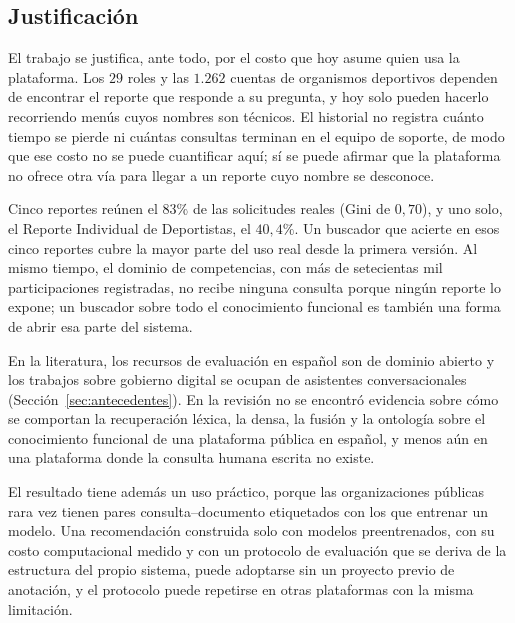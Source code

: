 \documentclass[11pt,letterpaper]{article}
\numberwithin{equation}{section}
\begin{document}
\subsection{Justificación}
\label{sec:justificacion}
El trabajo se justifica, ante todo, por el costo que hoy asume quien usa la plataforma. Los $29$ roles y las $1.262$ cuentas de organismos deportivos dependen de encontrar el reporte que responde a su pregunta, y hoy solo pueden hacerlo recorriendo menús cuyos nombres son técnicos. El historial no registra cuánto tiempo se pierde ni cuántas consultas terminan en el equipo de soporte, de modo que ese costo no se puede cuantificar aquí; sí se puede afirmar que la plataforma no ofrece otra vía para llegar a un reporte cuyo nombre se desconoce.

Cinco reportes reúnen el $83\%$ de las solicitudes reales (Gini de $0{,}70$), y uno solo, el Reporte Individual de Deportistas, el $40{,}4\%$. Un buscador que acierte en esos cinco reportes cubre la mayor parte del uso real desde la primera versión. Al mismo tiempo, el dominio de competencias, con más de setecientas mil participaciones registradas, no recibe ninguna consulta porque ningún reporte lo expone; un buscador sobre todo el conocimiento funcional es también una forma de abrir esa parte del sistema.

En la literatura, los recursos de evaluación en español son de dominio abierto y los trabajos sobre gobierno digital se ocupan de asistentes conversacionales (Sección~\ref{sec:antecedentes}). En la revisión no se encontró evidencia sobre cómo se comportan la recuperación léxica, la densa, la fusión y la ontología sobre el conocimiento funcional de una plataforma pública en español, y menos aún en una plataforma donde la consulta humana escrita no existe.

El resultado tiene además un uso práctico, porque las organizaciones públicas rara vez tienen pares consulta--documento etiquetados con los que entrenar un modelo. Una recomendación construida solo con modelos preentrenados, con su costo computacional medido y con un protocolo de evaluación que se deriva de la estructura del propio sistema, puede adoptarse sin un proyecto previo de anotación, y el protocolo puede repetirse en otras plataformas con la misma limitación.
\end{document}
